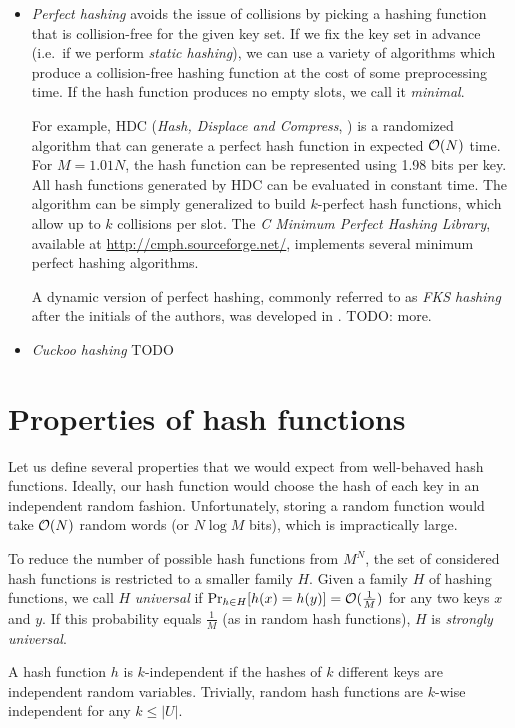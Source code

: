 \begin{itemize}
\item
\emph{Perfect hashing} avoids the issue of collisions by picking a hashing
function that is collision-free for the given key set. If we fix the key
set in advance (i.e.\ if we perform \emph{static hashing}), we can use
a variety of algorithms which produce a collision-free hashing function
at the cost of some preprocessing time. If the hash function produces no
empty slots, we call it \emph{minimal}.

For example, HDC (\textit{Hash, Displace and Compress},
\cite{hdc-hashing}) is a randomized algorithm that can generate a perfect
hash function in expected $\mathcal{O}(N)$ time. For $M=1.01 N$, the hash function can be
represented using 1.98 bits per key. All hash functions generated by HDC can be
evaluated in constant time. The algorithm can be simply generalized to build
$k$-perfect hash functions, which allow up to $k$ collisions per slot.
The \textit{C Minimum Perfect Hashing Library}, available at
\url{http://cmph.sourceforge.net/}, implements several minimum perfect hashing
algorithms.

A dynamic version of perfect hashing, commonly referred to as \emph{FKS
hashing} after the initials of the authors, was developed in \cite{fks-hashing}.
TODO: more.

\item
\emph{Cuckoo hashing}
TODO

\end{itemize}

\section{Properties of hash functions}
Let us define several properties that we would expect from well-behaved hash
functions. Ideally, our hash function would choose the hash of each key
in an independent random fashion. Unfortunately, storing a random function
would take $\mathcal{O}(N)$ random words (or $N \log M$ bits), which is impractically
large.

To reduce the number of possible hash functions from $M^N$, the set of
considered hash functions is restricted to a smaller family $H$.
Given a family $H$ of hashing functions, we call $H$ \emph{universal} if
$\Pr_{h\in H}[h(x)=h(y)]=\mathcal{O}(\frac{1}{M})$ for any two keys $x$ and $y$.
If this probability equals $\frac{1}{M}$ (as in random hash functions),
$H$ is \emph{strongly universal}. %

A hash function $h$ is $k$-independent if the hashes of $k$ different keys
are independent random variables. Trivially, random hash functions are
$k$-wise independent for any $k\leq |U|$.
